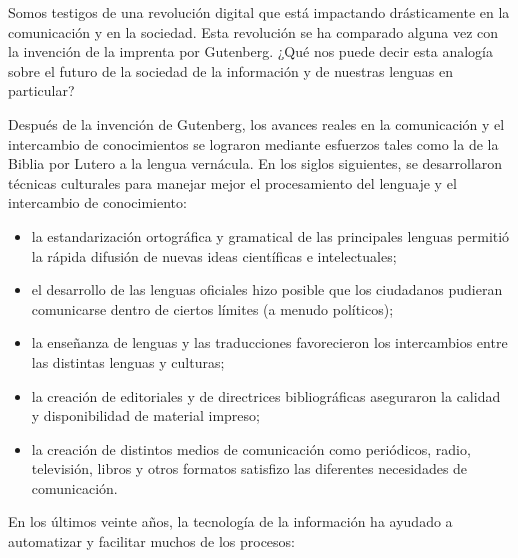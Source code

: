 \begin{multicols}{2}
  Somos testigos de una revolución digital que está impactando drásticamente en la comunicación y en la sociedad. Esta revolución se ha comparado alguna vez con la invención de la imprenta por Gutenberg. ¿Qué nos puede decir esta analogía sobre el futuro de la sociedad de la información y de nuestras lenguas en particular?


Después de la invención de Gutenberg, los avances reales en la comunicación y el intercambio de conocimientos se lograron mediante esfuerzos tales como la de la Biblia por Lutero a la lengua vernácula. En los siglos siguientes, se desarrollaron técnicas culturales para manejar mejor el procesamiento del lenguaje y el intercambio de conocimiento:

\begin{itemize}
  \item la estandarización ortográfica y gramatical de las principales lenguas permitió la rápida difusión de nuevas ideas científicas e intelectuales; 
  \item	el desarrollo de las lenguas oficiales hizo posible que los ciudadanos pudieran comunicarse dentro de ciertos límites (a menudo políticos);
  \item	la enseñanza de lenguas y las traducciones favorecieron los  intercambios entre las distintas lenguas y culturas;
  \item	la creación de editoriales y de directrices bibliográficas aseguraron la calidad y disponibilidad de material impreso;
  \item	la creación de distintos medios de comunicación como periódicos, radio, televisión, libros y otros formatos satisfizo las diferentes necesidades de comunicación. 
\end{itemize}

  En los últimos veinte años, la tecnología de la información ha ayudado a automatizar y facilitar muchos de los procesos:


\end{multicols}
